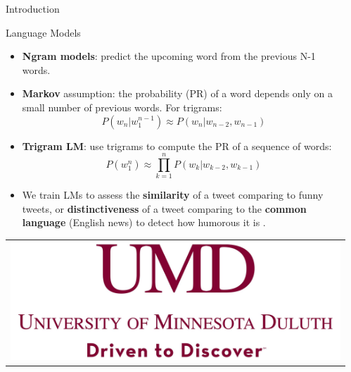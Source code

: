 \documentclass[final]{beamer}
\newlength{\sepwid}
\newlength{\onecolwid}
\begin{document}
\begin{frame}[t]
\begin{columns}[t]
\begin{column}{\onecolwid}
\begin{block}{Introduction}
\end{block}


\begin{block}{Language Models}
\begin{itemize}
\item \textbf{Ngram models}: predict the upcoming word from the previous N-1 words.
\item \textbf{Markov} assumption: the probability (PR) of a word depends only on a small number of previous words. For trigrams:
\begin{equation}
P(w_n|w_1^{n-1})\approx P(w_n|w_{n-2}, w_{n-1})
\end{equation}
\item \textbf{Trigram LM}: use trigrams to compute the PR of a sequence of words:
\begin{equation}
P(w_1^n)\approx \prod_{k=1}^{n} P(w_k|w_{k-2}, w_{k-1})
\end{equation}
\item We train LMs to assess the \textbf{similarity} of a tweet comparing to funny tweets, or \textbf{distinctiveness} of a tweet comparing to the \textbf{common language} (English news) to detect how humorous it is \cite{hello}.
\end{itemize}
\end{block}

\begin{center}
\begin{tabular}{c}
\includegraphics[width=0.7\linewidth]{logo.png}\\
\end{tabular}
\end{center}

\end{column} %

\begin{column}{\sepwid}\end{column} %


\end{columns}
\end{frame}
\end{document}
